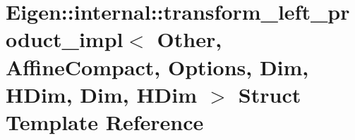 \hypertarget{struct_eigen_1_1internal_1_1transform__left__product__impl_3_01_other_00_01_affine_compact_00_015e9b9427c7ea1ff34d05c5964520dbab}{}\section{Eigen\+:\+:internal\+:\+:transform\+\_\+left\+\_\+product\+\_\+impl$<$ Other, Affine\+Compact, Options, Dim, H\+Dim, Dim, H\+Dim $>$ Struct Template Reference}
\label{struct_eigen_1_1internal_1_1transform__left__product__impl_3_01_other_00_01_affine_compact_00_015e9b9427c7ea1ff34d05c5964520dbab}
